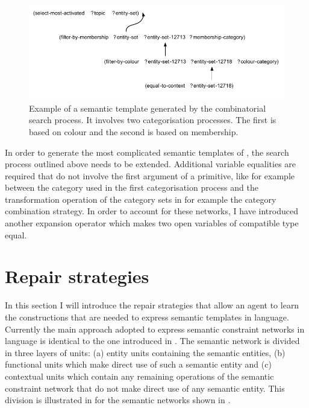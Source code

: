 \begin{figure}[htbp]
  \begin{center}
    \includegraphics[width=\textwidth]{./composition/figures/composed-network.pdf}
    \caption[Example of a semantic template generated by the
    combinatorial search process]{Example of a semantic template
      generated by the combinatorial search process. It involves two
      categorisation processes. The first is based on colour and the
      second is based on membership.}
    \label{f:composed-network}
  \end{center}
\end{figure}

In order to generate the most complicated semantic templates of , the search process outlined above needs to be
extended. Additional variable equalities are required that do not
involve the first argument of a primitive, like for example between
the category used in the first categorisation process and the
transformation operation of the category sets in for example the
category combination strategy. In order to account for these
networks, I have introduced another expansion operator which makes two
open variables of compatible type equal.

\section{Repair strategies}
\label{s:repair-strategies}

In this section I will introduce the repair strategies that allow an
agent to learn the constructions that are needed to express semantic
templates in language. Currently the main approach adopted to express
semantic constraint networks in language is identical to the one
introduced in . The semantic network is
divided in three layers of units: (a) entity units containing the
semantic entities, (b) functional units which make direct use of such
a semantic entity and (c) contextual units which contain any remaining
operations of the semantic constraint network that do not make direct
use of any semantic entity. This division is illustrated in  for the semantic networks shown in .

